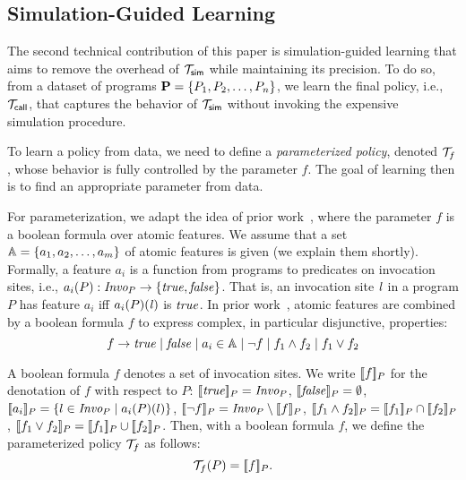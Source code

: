 
\subsection{Simulation-Guided Learning}\label{sec:learning}

The second technical contribution of this paper is simulation-guided learning that aims to remove the overhead of $\mathcal{T}_{{\sf sim}}$ while maintaining its precision. 
To do so, from a dataset of programs $\mathbf{P} = \{ P_1, P_2, \dots, P_n \}$, 
we learn the final policy, i.e., $\mathcal{T}_{{\sf call}}$, that captures the behavior of
$\mathcal{T}_{{\sf sim}}$ without invoking the expensive simulation procedure. 


To learn a policy from data, we need to define a {\em parameterized
  policy}, denoted $\mathcal{T}_f$, whose behavior is
fully controlled by the parameter $f$. The goal of learning then
is to find an appropriate parameter from data.

For parameterization, we adapt the idea of prior work~\cite{JeJeChOh17},
where the parameter $f$ is a boolean formula over atomic features.
We assume that a set $\mathbb{A} = \{ a_1, a_2, \dots, a_m \}$ of atomic
features is given (we explain them shortly).  
Formally, a feature
$a_i$ is a function from programs to predicates on invocation sites, i.e.,
$a_i(P): \text{\it Invo}_P \to \{ {\it true}, {\it false} \}$.
That is, an invocation site ${\it l}$ in a program $P$ has feature
$a_i$ iff $a_i(P)({\it l})$ is ${\it true}$.
In prior work~\cite{JeJeOh18}, atomic features are combined by a
boolean formula $f$ to express complex, in particular disjunctive, 
properties: 
\[
f \to {\it true} \mid {\it false} \mid a_i \in \mathbb{A} \mid \neg f \mid f_1 \land
f_2 \mid f_1 \vee f_2
\]


A boolean formula $f$ denotes a set of
invocation sites. We write $[\![f]\!]_{P}$ for the denotation of $f$
with respect to $P$:  $[\![{\it true}]\!]_{P} = \text{\it Invo}_P$,
$[\![{\it false}]\!]_{P} = \emptyset$,
$[\![a_i]\!]_{P} = \{ l \in \text{\it Invo}_P \mid a_i(P)(l) \}$,
$[\![\neg f]\!]_{P} = \text{\it Invo}_P \setminus [\![f]\!]_{P}$,
$ [\![f_1 \land f_2]\!]_{P} = [\![f_1]\!]_{P} \cap
[\![f_2]\!]_{P}$,
$[\![f_1 \vee f_2]\!]_{P} = [\![f_1]\!]_{P} \cup
                                    [\![f_2]\!]_{P}$.
Then, with a boolean formula $f$, we define the parameterized policy
$\mathcal{T}_f$ as follows:
\[
\mathcal{T}_f(P) = [\![f]\!]_{P}.
\]



